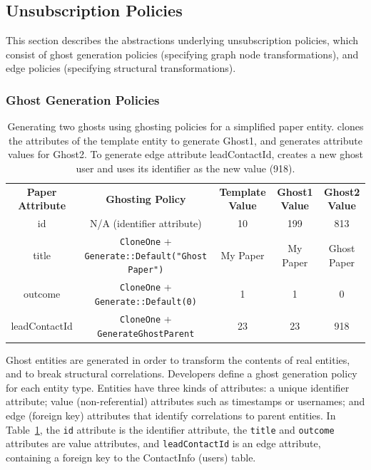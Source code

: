 \subsection{Unsubscription Policies}
\label{sec:unsub}

This section describes the abstractions underlying unsubscription policies, which consist of ghost
generation policies (specifying graph node transformations), and edge policies (specifying
structural transformations).

\subsubsection{Ghost Generation Policies}
\label{sec:ghosting}

\begin{table}[t!]
    \centering
    \footnotesize
\begin{tabular}{@{}ccccc@{}}
\textbf{Paper Attribute} & \textbf{Ghosting Policy} & \textbf{Template Value} & \textbf{Ghost1 Value} & \textbf{Ghost2 Value} 
  \\ \cmidrule(r){1-5}
    {id} & N/A (identifier attribute) & 10 & 199 & 813 \\
{title} & \texttt{CloneOne} + \texttt{Generate::Default("Ghost Paper")} & My Paper & My
    Paper & Ghost Paper \\
{outcome} & \texttt{CloneOne} + \texttt{Generate::Default(0)} & 1 & 1 & 0 \\
{leadContactId} & \texttt{CloneOne} + \texttt{GenerateGhostParent} & 23 & 23 & 918 \\
\end{tabular}
    \caption{Generating two ghosts using ghosting policies for a simplified paper entity.
    \sys clones the attributes of the template entity to generate Ghost1, and generates
    attribute values for Ghost2. To generate edge attribute leadContactId, \sys creates a new ghost user and uses its identifier as the new value (918).}
    \label{tab:ghosting}
\end{table}

Ghost entities are generated in order to transform the contents of real entities, and to
break structural correlations. Developers define a ghost generation policy for each entity type.
Entities have three kinds of attributes: a unique identifier attribute; value
(non-referential) attributes such as timestamps or usernames; and edge (foreign key)
attributes that identify correlations to parent entities.  
%
%
In Table~\ref{tab:ghosting}, the \texttt{id} attribute is the identifier attribute, the
\texttt{title} and \texttt{outcome} attributes are value attributes, and \texttt{leadContactId} is
an edge attribute, containing a foreign key to the ContactInfo (users) table. 

